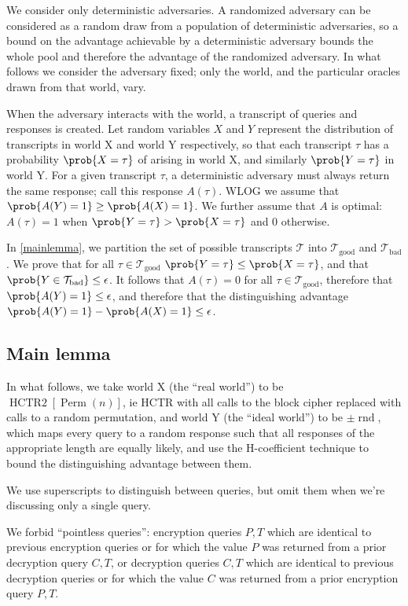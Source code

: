 \documentclass[letterpaper,11pt]{article}
\newcommand*{\Tb}{\mathcal{T}_\mathrm{bad}}
\newcommand*{\Tg}{\mathcal{T}_\mathrm{good}}
\DeclareMathOperator{\HCTR}{HCTR2}
\DeclareMathOperator{\Perm}{Perm}
\DeclareMathOperator{\rnd}{rnd}
\begin{document}
We consider only deterministic adversaries.
A randomized adversary can be considered as a random draw
from a population of deterministic adversaries, so
a bound on the advantage achievable by a deterministic
adversary bounds the whole pool and therefore
the advantage of the randomized adversary. In what follows
we consider the adversary fixed; only the world, and the
particular oracles drawn from that world, vary.

When the adversary interacts with the world,
a transcript of queries and responses is created.
Let random variables \(X\) and \(Y\)
represent the distribution of transcripts
in world X and world Y respectively, so that
each transcript \(\tau\) has a probability \(\prob{X = \tau}\)
of arising in world X, and similarly \(\prob{Y = \tau}\) in world Y.
For a given transcript \(\tau\), a deterministic adversary must always
return the same response; call this response \(A(\tau)\).
WLOG we assume that \(\prob{A(Y) = 1} \geq \prob{A(X) = 1}\).
We further assume that \(A\) is optimal:
\(A(\tau) = 1\)
when \(\prob{Y = \tau} > \prob{X = \tau}\) and 0 otherwise.

In \autoref{mainlemma}, we partition the set of possible transcripts
\(\mathcal{T}\) into \(\Tg\) and \(\Tb\). 
We prove that for all \(\tau \in \Tg\)
\(\prob{Y = \tau} \leq \prob{X = \tau}\),
and that \(\prob{Y \in \Tb} \leq \epsilon\).
It follows that \(A(\tau) = 0\) for all \(\tau \in \Tg\),
therefore that \(\prob{A(Y) = 1} \leq \epsilon\),
and therefore that the distinguishing advantage
\(\prob{A(Y) = 1} - \prob{A(X) = 1} \leq \epsilon\).

\subsection{Main lemma}\label{mainlemma}
In what follows, we take world X (the ``real world'') 
to be \(\HCTR[\Perm(n)]\),
ie HCTR with all calls to the block cipher
replaced with calls to a random permutation,
and world Y (the ``ideal world'') to be \(\pm\rnd\),
which maps every query to a random response such that
all responses of the appropriate length are equally likely,
and use the H-coefficient technique to bound
the distinguishing advantage between them.

We use superscripts to distinguish between queries, but
omit them when we're discussing only a single query.

We forbid ``pointless queries'':
encryption queries \(P, T\)
which are identical to previous encryption queries
or for which the value \(P\) was returned from a prior
decryption  query \(C, T\), or
decryption queries \(C, T\)
which are identical to previous decryption queries
or for which the value \(C\) was returned from a prior
encryption query \(P, T\).
\end{document}
